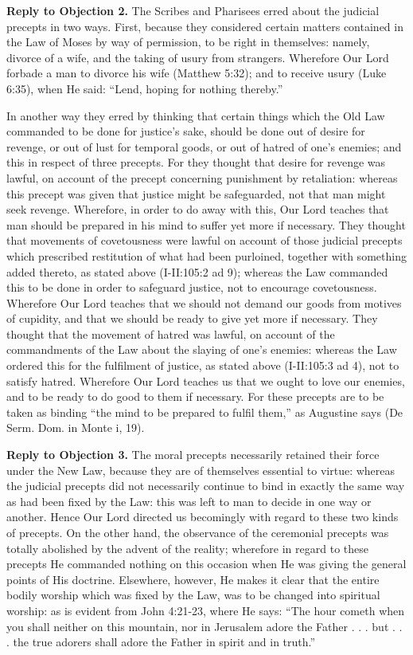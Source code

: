 \textbf{Reply to Objection 2.} The Scribes and Pharisees erred about the judicial precepts in two ways. First, because they considered certain matters contained in the Law of Moses by way of permission, to be right in themselves: namely, divorce of a wife, and the taking of usury from strangers. Wherefore Our Lord forbade a man to divorce his wife (Matthew 5:32); and to receive usury (Luke 6:35), when He said: ``Lend, hoping for nothing thereby.''

In another way they erred by thinking that certain things which the Old Law commanded to be done for justice's sake, should be done out of desire for revenge, or out of lust for temporal goods, or out of hatred of one's enemies; and this in respect of three precepts. For they thought that desire for revenge was lawful, on account of the precept concerning punishment by retaliation: whereas this precept was given that justice might be safeguarded, not that man might seek revenge. Wherefore, in order to do away with this, Our Lord teaches that man should be prepared in his mind to suffer yet more if necessary. They thought that movements of covetousness were lawful on account of those judicial precepts which prescribed restitution of what had been purloined, together with something added thereto, as stated above (I-II:105:2 ad 9); whereas the Law commanded this to be done in order to safeguard justice, not to encourage covetousness. Wherefore Our Lord teaches that we should not demand our goods from motives of cupidity, and that we should be ready to give yet more if necessary. They thought that the movement of hatred was lawful, on account of the commandments of the Law about the slaying of one's enemies: whereas the Law ordered this for the fulfilment of justice, as stated above (I-II:105:3 ad 4), not to satisfy hatred. Wherefore Our Lord teaches us that we ought to love our enemies, and to be ready to do good to them if necessary. For these precepts are to be taken as binding ``the mind to be prepared to fulfil them,'' as Augustine says (De Serm. Dom. in Monte i, 19).

\textbf{Reply to Objection 3.} The moral precepts necessarily retained their force under the New Law, because they are of themselves essential to virtue: whereas the judicial precepts did not necessarily continue to bind in exactly the same way as had been fixed by the Law: this was left to man to decide in one way or another. Hence Our Lord directed us becomingly with regard to these two kinds of precepts. On the other hand, the observance of the ceremonial precepts was totally abolished by the advent of the reality; wherefore in regard to these precepts He commanded nothing on this occasion when He was giving the general points of His doctrine. Elsewhere, however, He makes it clear that the entire bodily worship which was fixed by the Law, was to be changed into spiritual worship: as is evident from John 4:21-23, where He says: ``The hour cometh when you shall neither on this mountain, nor in Jerusalem adore the Father . . . but . . . the true adorers shall adore the Father in spirit and in truth.''

